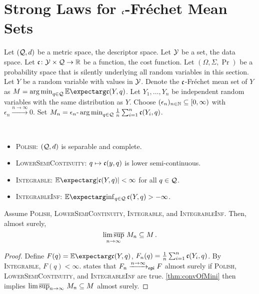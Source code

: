 %
\section{Strong Laws for $\mathfrak{c}$-Fréchet Mean Sets}\label{sec:gen}
%
Let $(\mathcal{Q}, d)$ be a metric space, the descriptor space. Let $\mathcal{Y}$ be a set, the data space. Let $\mathfrak{c}\colon \mathcal{Y} \times\mathcal{Q} \to \mathbb{R}$ be a function, the cost function. Let $(\Omega, \Sigma, \Pr)$ be a probability space that is silently underlying all random variables in this section. Let $Y$ be a random variable with values in $\mathcal{Y}$. Denote the $\mathfrak{c}$-Fréchet mean set of $Y$ as $M = \argmin_{q\in\mc Q} \Ex{\mf c(Y, q)}$.
Let $Y_1, \dots, Y_n$ be independent random variables with the same distribution as $Y$.
Choose $(\epsilon_n)_{n\in\mathbb{N}}\subseteq [0,\infty)$ with $\epsilon_n \xrightarrow{n\to\infty}0$. Set $M_n = \epsilon_n\text{-}\operatorname*{arg\,min}_{q\in\mathcal{Q}} \frac1n \sum_{i=1}^n \mathfrak{c}(Y_i, q)$.
%
\begin{assumptions}\mbox{ }
\begin{itemize}
\item 
	\textsc{Polish}: 
	$(\mathcal{Q}, d)$ is separable and complete.
\item 
	\textsc{LowerSemiContinuity}: 
	$q \mapsto \mathfrak{c}(y, q)$ is lower semi-continuous.
\item 
	\textsc{Integrable}: 
	$\Ex{\abs{\mf c(Y, q)}} < \infty$ for all $q\in\mathcal{Q}$.
\item 
	\textsc{IntegrableInf}: 
	$\Ex{\inf_{q \in \mc Q}\mf c(Y, q)} > - \infty$.
\end{itemize}
\end{assumptions}
%
\begin{theorem}\label{thm:epi}
	Assume \textsc{Polish}, \textsc{LowerSemiContinuity}, \textsc{Integrable}, and \textsc{IntegrableInf}.
	Then, almost surely,
	\begin{equation*}
		\operatorname*{lim\, \overline{sup}}_{n\to\infty}\, M_n \subseteq M
		\, .
	\end{equation*}
\end{theorem}
%
\begin{proof}
Define $F(q) = \Ex{\mf c(Y, q)}$, $F_n(q) = \frac1n\sum_{i=1}^n \mathfrak{c}(Y_i, q)$. By \textsc{Integrable}, $F(q)<\infty$.
\cite[Theorem 1.1]{korf01} states that $F_n \xrightarrow{n\to\infty}_{\mathsf{epi}} F$ almost surely if \textsc{Polish}, \textsc{LowerSemiContinuity}, and \textsc{IntegrableInf} are true. \autoref{thm:convOfMini} then implies $\operatorname*{lim\, \overline{sup}}_{n\to\infty}\, M_n \subseteq M$ almost surely.
\end{proof}
%
